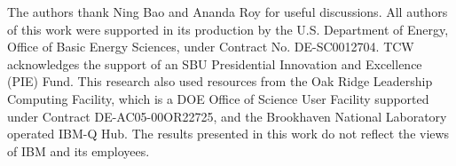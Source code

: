 \documentclass[twocolumn,aps,superscriptaddress,floatfix,longbibliography]{revtex4-2}
\newcommand{\Fig}[1]{Fig.\,\ref{fig:#1}}
\def\YX{\ensuremath{\mathit{YX}}\xspace} %
\def\YZ{\ensuremath{\mathit{YZ}}\xspace}
\begin{document}
The authors thank Ning Bao and Ananda Roy for useful discussions. All authors of this work were supported in its production by the U.S. Department of Energy, Office of Basic Energy Sciences, under Contract No. DE-SC0012704.
TCW acknowledges the support of an SBU Presidential Innovation and Excellence (PIE)
Fund. This research also used resources from the Oak Ridge Leadership Computing Facility, which is a DOE Office of Science User Facility supported under Contract DE-AC05-00OR22725, and the Brookhaven National Laboratory operated IBM-Q Hub. The results presented in this work do not reflect the views of IBM and its employees.

\appendix






\end{document}
